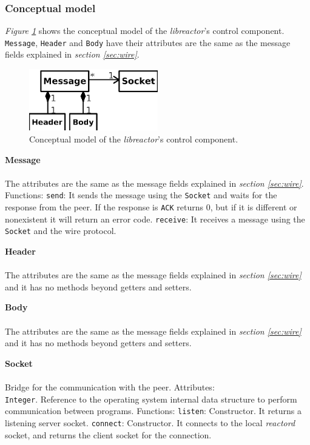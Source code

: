 \subsubsection{Conceptual model}
\emph{Figure \ref{fig:controlcm}} shows the conceptual model of the \emph{libreactor}'s control component. \texttt{Message}, 
\texttt{Header} and \texttt{Body} have their attributes are the same as the message fields explained in \emph{section \ref{sec:wire}}.
\begin{figure}[h]
  \centering
  \includegraphics[width=0.5\textwidth,keepaspectratio]{img/controlcm}
  \caption{Conceptual model of the \emph{libreactor}'s control component.}
  \label{fig:controlcm}
\end{figure}
\begin{list}{}{}
  \item {\bf Message}\\
    \\
    The attributes are the same as the message fields explained in \emph{section \ref{sec:wire}}.
    \subitem Functions:
      \subsubitem \texttt{send}:
	It sends the message using the \texttt{Socket} and waits for the response from the peer. If the response is \texttt{ACK} returns
	0, but if it is different or nonexistent it will return an error code.
      \subsubitem \texttt{receive}:
	It receives a message using the \texttt{Socket} and the wire protocol.
  \item {\bf Header}\\
    \\
    The attributes are the same as the message fields explained in \emph{section \ref{sec:wire}} and it has no methods beyond getters and
    setters.
  \item {\bf Body}\\
    \\
    The attributes are the same as the message fields explained in \emph{section \ref{sec:wire}} and it has no methods beyond getters and
    setters.
  \item {\bf Socket}\\
    \\
    Bridge for the communication with the peer.
    \subitem Attributes:
       \\
	\texttt{Integer}. Reference to the operating system internal data structure to perform communication between programs.
    \subitem Functions:
      \subsubitem \texttt{listen}:
	Constructor. It returns a listening server socket.
      \subsubitem \texttt{connect}:
	Constructor. It connects to the local \emph{reactord} socket, and returns the client socket for the connection.	
\end{list}

